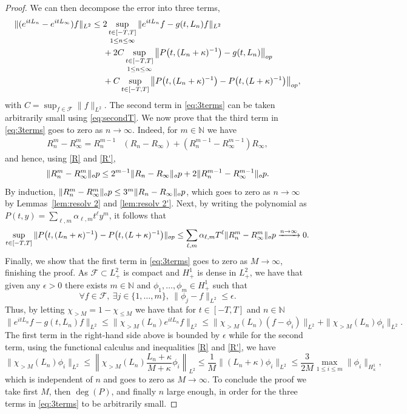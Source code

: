 \documentclass[10pt,a4paper]{amsart}
\newcommand{\op}{\textup{op}}
\begin{document}
\begin{proof}
We can then decompose the error into three terms,
\begin{align}\label{eq:3terms}
\| (e^{itL_n} - e^{itL_\infty})f \|_{L^2}\nonumber
{}\leq{}& 2\sup_{\substack{t \in [-T,T] \\[.2em] 1\le n \le \infty }}\| e^{itL_{n}}f - g(t, L_n)f \|_{L^2} \\
&+ 2C\sup_{\substack{t \in [-T,T] \\[.2em] 1\le n \le \infty }} \big\|  P\big(t, (L_n+\kappa)^{-1}\big) - g(t, L_n) \big\|_{\op} \\\nonumber
&+ C\sup_{t\in[-T,T]}\big\|  P\big(t, (L_n+\kappa)^{-1}\big) - P\big(t,(L+\kappa)^{-1}\big) \big\|_{\op},
\end{align}
with $C = \sup_{f\in \mathcal{F}} \| f\|_{L^2}$. The second term in \eqref{eq:3terms} can be taken arbitrarily small using \eqref{eq:secondT}. We now prove that the third term in \eqref{eq:3terms} goes to zero as $n\to \infty$. Indeed, for $m\in \mathbb{N}$ we have
\begin{align*}
R_n^{m} - R_\infty^{m} = R_n^{m-1} &\left( R_n - R_\infty \right) 
+\left(R_n^{m-1} - R_\infty^{m-1} \right)R_\infty,
\end{align*}
and hence, using \eqref{R} and \eqref{R'},
\[
\|R_n^{m} - R^{m}_\infty \|_\op \le 2^{m-1}\|R_n - R_\infty \|_\op + 2
\|R_n^{m-1} - R_\infty^{m-1}\|_\op.
\]
By induction, $\|R_n^{m} - R^{m}_\infty \|_\op \le 3^m \|R_n - R_\infty \|_\op$, which goes to zero as $n\to \infty$ by Lemmas~\ref{lem:resolv 2} and \ref{lem:resolv 2'}.
Next, by writing the polynomial as $P(t,y) = \sum_{\ell,m}\alpha_{\ell,m} t^{\ell} y^{m}$, it follows that
\[
\sup_{t\in[-T,T]}\|  P\big(t, (L_n+\kappa)^{-1}\big) - P\big(t,(L+\kappa)^{-1}\big)\|_{\op} \le \sum_{\ell, m} \alpha_{\ell,m} T^{\ell} \|R_n^{m} - R_\infty^{m} \|_\op \xrightarrow{n\to\infty} 0 .
\]
%
Finally, we show that the first term in \eqref{eq:3terms} goes to zero as $M \to \infty$, finishing the proof. As $\mathcal{F} \subset L^2_+$ is compact and $H^1_{+}$ is dense in $L^2_{+}$, we have that given any $\epsilon>0$ there exists $m\in\mathbb{N}$ and $\phi_1, \dots, \phi_m \in H^1_{+}$ such that 
\[
\forall f\in\mathcal{F}, \ \exists j \in \{1,\dots, m\},\ \|\phi_j - f\|_{L^2} \le \epsilon.
\]
Thus, by letting $\chi_{>M} = 1-\chi_{\le M}$ we have that for $t\in[-T,T]$ and $n\in\mathbb{N}$
\[
\| e^{itL_{n}}f - g(t, L_n)f \|_{L^2} \le \| \chi_{> M}(L_n)e^{itL_n}f\|_{L^2} \le \| \chi_{>M}(L_n) (f-\phi_i) \|_{L^2} + \| \chi_{>M}(L_{n})\phi_i\|_{L^2}.
\]
The first term in the right-hand side above is bounded by $\epsilon$ while for the second term, using the functional calculus and inequalities \eqref{R} and \eqref{R'}, we have
\[
\| \chi_{>M}(L_n) \phi_i\|_{L^2} \le \left\| \chi_{>M}(L_n)\frac{L_n+\kappa}{M+\kappa}\phi_i\right\|_{L^2}
\le \frac{1}{M} \| (L_n+ \kappa)\phi_i\|_{L^2}
\le \frac{3}{2M} \max_{1\le i\le m}\| \phi_i\|_{H^1_{\kappa}},
\]
which is independent of $n$ and goes to zero as $M\to \infty$.
To conclude the proof we take first $M$, then $\deg(P)$, and finally $n$ large enough, in order for the three terms in \eqref{eq:3terms} to be arbitrarily small. \qedhere

\end{proof}
\end{document}
